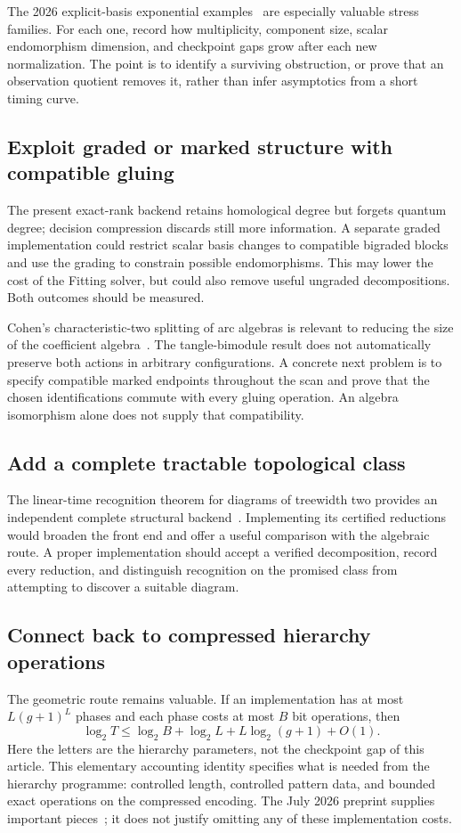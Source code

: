 The 2026 explicit-basis exponential examples~\cite{kelomaki} are especially
valuable stress families. For each one, record how multiplicity, component
size, scalar endomorphism dimension, and checkpoint gaps grow after each new
normalization. The point is to identify a surviving obstruction, or prove
that an observation quotient removes it, rather than infer asymptotics from
a short timing curve.

\subsection{Exploit graded or marked structure with compatible gluing}
The present exact-rank backend retains homological degree but forgets quantum
degree; decision compression discards still more information. A separate
graded implementation could restrict scalar basis changes to compatible
bigraded blocks and use the grading to constrain possible endomorphisms.
This may lower the cost of the Fitting solver, but could also remove useful
ungraded decompositions. Both outcomes should be measured.

Cohen's characteristic-two splitting of arc algebras is relevant to reducing
the size of the coefficient algebra~\cite{cohen}. The tangle-bimodule result
does not automatically preserve both actions in arbitrary configurations.
A concrete next problem is to specify compatible marked endpoints throughout
the scan and prove that the chosen identifications commute with every gluing
operation. An algebra isomorphism alone does not supply that compatibility.

\subsection{Add a complete tractable topological class}
The linear-time recognition theorem for diagrams of treewidth two provides
an independent complete structural backend~\cite{treewidthtwo}. Implementing
its certified reductions would broaden the front end and offer a useful
comparison with the algebraic route. A proper implementation should accept a
verified decomposition, record every reduction, and distinguish recognition
on the promised class from attempting to discover a suitable diagram.

\subsection{Connect back to compressed hierarchy operations}
The geometric route remains valuable. If an implementation has at most
$L(g+1)^L$ phases and each phase costs at most $B$ bit operations, then
\[
 \log_2 T\le \log_2 B+\log_2 L+L\log_2(g+1)+O(1).
\]
Here the letters are the hierarchy parameters, not the checkpoint gap of
this article. This elementary accounting identity specifies what is needed
from the hierarchy programme: controlled length, controlled pattern data,
and bounded exact operations on the compressed encoding. The July 2026
preprint supplies important pieces~\cite{lackenby2026}; it does not justify
omitting any of these implementation costs.

